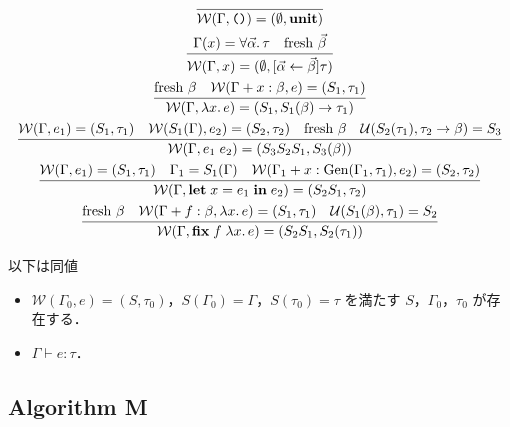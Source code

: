 \begin{gather*}
  \infer{\mathcal{W}(\Gamma, \text{\texttt{()}}) = (\emptyset, \mathbf{unit})}{}
  \\
  \infer{\mathcal{W}(\Gamma, x) = (\emptyset, [\vec{\alpha} \assign \vec{\beta}]\tau)}{
    \Gamma(x) = \forall\vec{\alpha}\ldotp \tau
    &
    \text{fresh $\vec{\beta}$}
  }
  \\
  \infer{\mathcal{W}(\Gamma, \lambda x\ldotp e) = (S_1, S_1(\beta) \to \tau_1)}{
    \text{fresh $\beta$}
    &
    \mathcal{W}(\Gamma + x:\beta, e) = (S_1, \tau_1)
  }
  \\
  \infer{\mathcal{W}(\Gamma, e_1\; e_2) = (S_3S_2S_1, S_3(\beta))}{
    \mathcal{W}(\Gamma, e_1) = (S_1, \tau_1)
    &
    \mathcal{W}(S_1(\Gamma), e_2) = (S_2, \tau_2)
    &
    \text{fresh $\beta$}
    &
    \mathcal{U}(S_2(\tau_1), \tau_2 \to \beta) = S_3
  }
  \\
  \infer{\mathcal{W}(\Gamma, \mathbf{let}\;x = e_1\;\mathbf{in}\;e_2) = (S_2S_1, \tau_2)}{
    \mathcal{W}(\Gamma, e_1) = (S_1, \tau_1)
    &
    \Gamma_1 = S_1(\Gamma)
    &
    \mathcal{W}(\Gamma_1 + x:\mathrm{Gen}(\Gamma_1, \tau_1), e_2) = (S_2, \tau_2)
  }
  \\
  \infer{\mathcal{W}(\Gamma, \mathbf{fix}\;f\;\lambda x\ldotp e) = (S_2S_1, S_2(\tau_1))}{
    \text{fresh $\beta$}
    &
    \mathcal{W}(\Gamma + f:\beta, \lambda x\ldotp e) = (S_1, \tau_1)
    &
    \mathcal{U}(S_1(\beta), \tau_1) = S_2
  }
\end{gather*}

\begin{theorem}
  以下は同値
  \begin{itemize}
    \item $\mathcal{W}(\Gamma_0, e) = (S, \tau_0)$，$S(\Gamma_0) = \Gamma$，$S(\tau_0) = \tau$ を満たす $S$，$\Gamma_0$，$\tau_0$ が存在する．
    \item $\Gamma \vdash e: \tau$．
  \end{itemize}
\end{theorem}

\subsection{Algorithm M}

